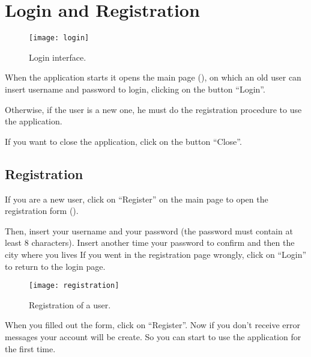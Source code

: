 \section{Login and Registration}

\begin{figure}[H]
	\texttt{[image: login]}
	\caption{Login interface.}\label{fig:login}
\end{figure}

When the application starts it opens the main page (), on
which an old user can insert username and password to login, clicking on the
button ``Login''.

Otherwise, if the user is a new one, he must do the registration procedure to
use the application.

If you want to close the application, click on the button ``Close''.

\subsection{Registration}

If you are a new user, click on ``Register'' on the main page to open the
registration form ().

Then, insert your username and your password (the password must contain at least
8 characters). Insert another time your password to confirm and then the city
where you lives If you went in the registration page wrongly, click on ``Login''
to return to the login page.

\begin{figure}[H]
	\texttt{[image: registration]}
	\caption{Registration of a user.}\label{fig:registration}
\end{figure}

When you filled out the form, click on ``Register''. Now if you don’t receive
error messages your account will be create. So you can start to use the
application for the first time.
